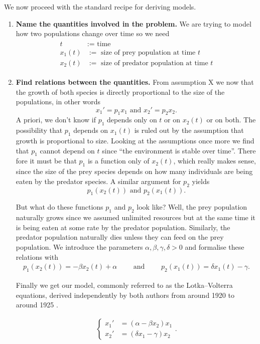 We now proceed with the standard recipe for deriving models.

\begin{enumerate}
  \item \textbf{Name the quantities involved in the problem.} We are trying to
    model how two populations change over time so we need
    \begin{align*}
      \begin{array}
        {cl}
        t &:= \text{ time} \\
        x_1(t) &:= \text{ size of prey population at time } t \\
        x_2(t) &:= \text{ size of predator population at time } t
      \end{array}
    \end{align*}

  \item \textbf{Find relations between the quantities.} From assumption X we
    now that the growth of both species is directly proportional to the size of
    the populations, in other words
    \[
      x_1' = p_1 x_1\text{ and } x_2' = p_2 x_2.
    \]
    A priori, we don't know if $p_1$ depends only on $t$ or on $x_2(t)$ or on
    both. The possibility that $p_1$ depends on $x_1(t)$ is ruled out by the
    assumption that growth is proportional to size. Looking at the assumptions
    once more we find that $p_1$ cannot depend on $t$ since ``the environment
    is stable over time''. There fore it must be that $p_1$ is a function only
    of $x_2(t)$, which really makes sense, since the size of the prey species
    depends on how many individuals are being eaten by the predator species. A
    similar argument for $p_2$ yields
    \[
      p_1(x_2(t))\text{ and } p_2(x_1(t)).
    \]
    
    But what do these functions $p_1$ and $p_2$ look like? Well, the prey
    population naturally grows since we assumed unlimited resources but at the
    same time it is being eaten at some rate by the predator population.
    Similarly, the predator population naturally dies unless they can feed on
    the prey population. We introduce the parameters $\alpha, \beta, \gamma,
    \delta > 0$ and formalise these relations with
    \begin{align*}
      p_1(x_2(t)) = - \beta x_2(t) + \alpha 
      \qquad \text{ and } \qquad
      p_2(x_1(t)) = \delta x_1(t) - \gamma.
    \end{align*}

    Finally we get our model, commonly referred to as the Lotka--Volterra
    equations, derived independently by both authors from around 1920 to around
    1925 \cite{lotka-volterra}.
   
    \begin{align}
      \label{eq:lotka-volterra}
      \begin{cases}
        x_1' &= (\alpha - \beta x_2) x_1 \\
        x_2' &= (\delta x_1 - \gamma) x_2
      \end{cases}
      .
    \end{align}
\end{enumerate}

